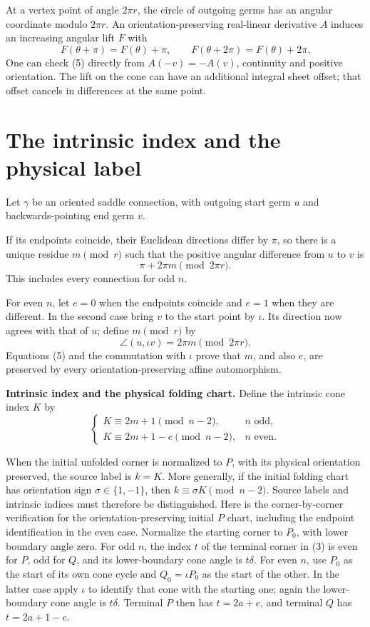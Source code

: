 \documentclass[11pt]{article}
\begin{document}
At a vertex point of angle \(2\pi r\), the circle of outgoing germs has an angular coordinate modulo \(2\pi r\). An orientation-preserving real-linear derivative \(A\) induces an increasing angular lift \(F\) with
\[
F(\theta+\pi)=F(\theta)+\pi,\qquad
F(\theta+2\pi)=F(\theta)+2\pi.
\tag{5}
\]
One can check (5) directly from \(A(-v)=-A(v)\), continuity and positive orientation. The lift on the cone can have an additional integral sheet offset; that offset cancels in differences at the same point.

\section{The intrinsic index and the physical label}

Let \(\gamma\) be an oriented saddle connection, with outgoing start germ \(u\) and backwards-pointing end germ \(v\).

If its endpoints coincide, their Euclidean directions differ by \(\pi\), so there is a unique residue \(m\pmod r\) such that the positive angular difference from \(u\) to \(v\) is
\[
\pi+2\pi m\pmod{2\pi r}.
\tag{6}
\]
This includes every connection for odd \(n\).

For even \(n\), let \(e=0\) when the endpoints coincide and \(e=1\) when they are different. In the second case bring \(v\) to the start point by \(\iota\). Its direction now agrees with that of \(u\); define \(m\pmod r\) by
\[
\angle(u,\iota v)=2\pi m\pmod{2\pi r}.
\tag{7}
\]
Equations (5) and the commutation with \(\iota\) prove that \(m\), and also \(e\), are preserved by every orientation-preserving affine automorphism.

\textbf{Intrinsic index and the physical folding chart.} Define the intrinsic cone index \(K\) by
\[
\begin{cases}
K\equiv2m+1\pmod{n-2},&n\text{ odd},\\
K\equiv2m+1-e\pmod{n-2},&n\text{ even}.
\end{cases}
\tag{8}
\]

When the initial unfolded corner is normalized to \(P\), with its physical orientation preserved, the source label is \(k=K\). More generally, if the initial folding chart has orientation sign \(\sigma\in\{1,-1\}\), then \(k\equiv\sigma K\pmod{n-2}\). Source labels and intrinsic indices must therefore be distinguished. Here is the corner-by-corner verification for the orientation-preserving initial \(P\) chart, including the endpoint identification in the even case. Normalize the starting corner to \(P_0\), with lower boundary angle zero. For odd \(n\), the index \(t\) of the terminal corner in (3) is even for \(P\), odd for \(Q\), and its lower-boundary cone angle is \(t\delta\). For even \(n\), use \(P_0\) as the start of its own cone cycle and \(Q_0=\iota P_0\) as the start of the other. In the latter case apply \(\iota\) to identify that cone with the starting one; again the lower-boundary cone angle is \(t\delta\). Terminal \(P\) then has \(t=2a+e\), and terminal \(Q\) has \(t=2a+1-e\).
\end{document}
